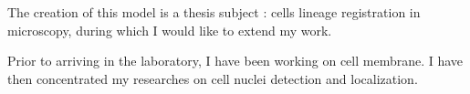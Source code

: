 The creation of this model is a thesis subject : cells lineage registration in microscopy, during which I would like to extend my work.

Prior to arriving in the laboratory, I have been working on cell membrane. I have then concentrated my researches on cell nuclei detection and localization.



%
%
%
%
%
%
%
%
%
%
%
%
